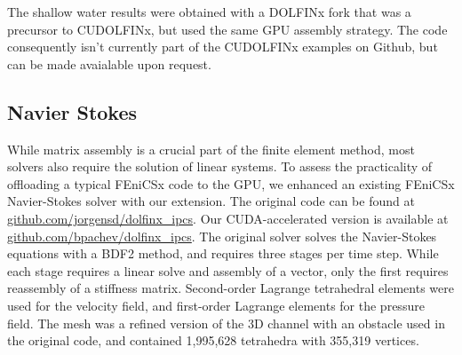 The shallow water results were obtained with a DOLFINx fork that was a precursor to CUDOLFINx, but used the same GPU assembly strategy. The code consequently isn't currently part of the CUDOLFINx examples on Github, but can be made avaialable upon request.

\subsection*{Navier Stokes}

While matrix assembly is a crucial part of the finite element method, most solvers also require the solution of linear systems. To assess the practicality of offloading a typical FEniCSx code to the GPU, we enhanced an existing FEniCSx Navier-Stokes solver with our extension. The original code can be found at \href{https://github.com/jorgensd/dolfinx\_ipcs}{github.com/jorgensd/dolfinx\_ipcs}. Our CUDA-accelerated version is available at \href{https://github.com/bpachev/dolfinx\_ipcs}{github.com/bpachev/dolfinx\_ipcs}. The original solver solves the Navier-Stokes equations with a BDF2 method, and requires three stages per time step. While each stage requires a linear solve and assembly of a vector, only the first requires reassembly of a stiffness matrix. Second-order Lagrange tetrahedral elements were used for the velocity field, and first-order Lagrange elements for the pressure field. The mesh was a refined version of the 3D channel with an obstacle used in the original code, and contained 1,995,628 tetrahedra with 355,319 vertices.

